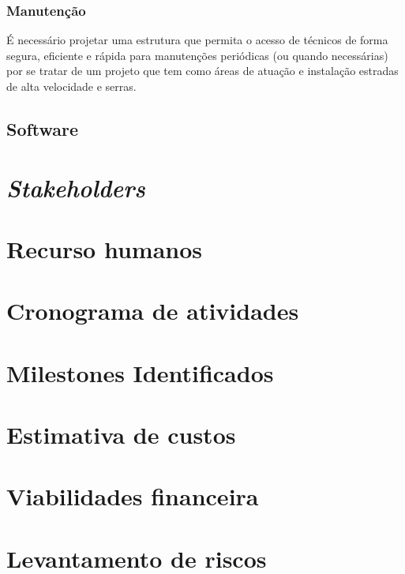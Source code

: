 \subsubsection{Manutenção}

É necessário projetar uma estrutura que permita o acesso de técnicos de forma segura, eficiente e rápida para manutenções periódicas (ou quando necessárias) por se tratar de um projeto que tem como áreas de atuação e instalação estradas de alta velocidade e serras.

\subsection{Software}
\section{\emph{Stakeholders}}
\section{Recurso humanos}
\section{Cronograma de atividades}
\section{Milestones Identificados}
\section{Estimativa de custos}
\section{Viabilidades financeira}
\section{Levantamento de riscos}

